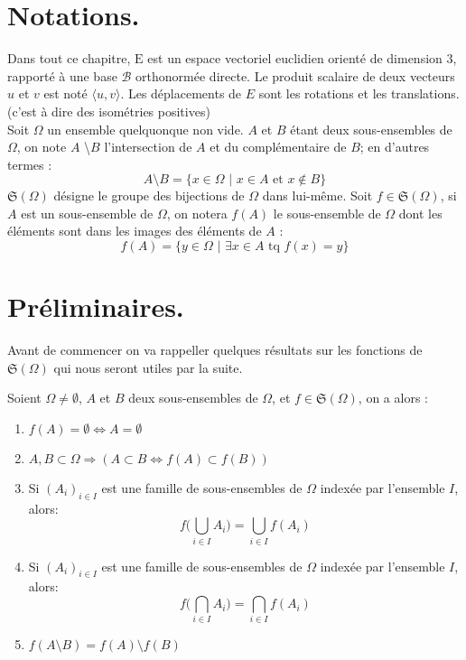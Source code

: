 \section{Notations.}
\noindent
Dans tout ce chapitre, $\mathrm{E}$ est un espace vectoriel euclidien orienté de dimension $3$, rapporté à une base $\mathcal{B}$ orthonormée directe. Le produit scalaire de deux vecteurs $u$ et $v$ est noté $\langle u, v \rangle$. Les déplacements de $E$ sont les rotations et les translations.(c'est à dire des isométries positives)\\
Soit $\Omega$ un ensemble quelquonque non vide. $A$ et $B$ étant deux sous-ensembles de $\Omega$, on note $A$ \textbackslash $B$
l'intersection de $A$ et du complémentaire de $B$; en d'autres termes :
$$A \text{\textbackslash} B = \{x \in \Omega \text{ | } x \in A \text{ et } x \notin B \}$$
$\mathfrak{S}(\Omega)$ désigne le groupe des bijections de $\Omega$ dans lui-même.
Soit $f \in \mathfrak{S}(\Omega)$, si $A$ est un sous-ensemble de $\Omega$, on notera $f(A)$ le sous-ensemble de $\Omega$ dont les éléments sont dans les
images des éléments de $A$ : $$f(A) = \{ y \in \Omega \text{ | } \exists x \in A \text{ tq } f(x)=y \}$$
\section{Préliminaires.}
\noindent
Avant de commencer on va rappeller quelques résultats sur les fonctions de $\mathfrak{S}(\Omega)$ qui nous seront utiles par la suite.
\begin{lemma}\label{lemme 1}
Soient $\Omega \ne \emptyset$, $A$ et $B$ deux sous-ensembles de $\Omega$, et $f \in \mathfrak{S}(\Omega)$, on a alors :
\begin{enumerate}
\item \label{1} $f(A)= \emptyset \Leftrightarrow  A=\emptyset$
\item \label{2}$A, B \subset \Omega \Rightarrow (A \subset B \Leftrightarrow f(A) \subset f(B))$
\item \label{3} Si $(A_i)_{i \in I}$ est une famille de sous-ensembles de $\Omega$ indexée par l'ensemble $I$, alors:
$$ f\big(\bigcup_{i \in I} A_i \big)= \bigcup_{i \in I} f(A_i) $$
\item \label{4} Si $(A_i)_{i \in I}$ est une famille de sous-ensembles de $\Omega$ indexée par l'ensemble $I$, alors:
$$ f\big(\bigcap_{i \in I} A_i \big)= \bigcap_{i \in I} f(A_i) $$
\item \label{5} $f(A \text{\textbackslash} B) = f(A) \text{\textbackslash} f(B)$
\end{enumerate}

\end{lemma}

